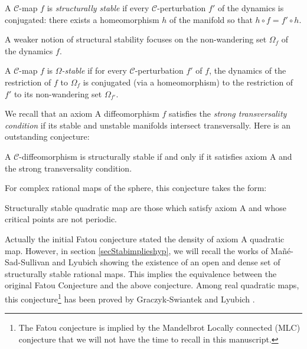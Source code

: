 \documentclass[11pt,openany,leqno]{article}
\begin{document}
 \begin{defi} A $\mathcal C$-map $f$ is \emph{structurally stable}  if every $\mathcal C$-perturbation $f'$ of the dynamics is conjugated: there exists a homeomorphism $h$ of the manifold so that $h\circ f= f'\circ h$. 
\end{defi}
A weaker notion of structural stability focuses on the non-wandering set $\Omega_f$ of the dynamics $f$.
\begin{defi} A $\mathcal C$-map $f$ is \emph{$\Omega$-stable}  if for every $\mathcal C$-perturbation $f'$ of $f$, the dynamics of the restriction of $f$ to $\Omega_f$ is conjugated (via a homeomorphism) to the restriction of $f'$ to its non-wandering set $\Omega_{f'}$.
\end{defi}

We recall that an axiom A diffeomorphism $f$ satisfies the \emph{strong transversality condition} if its stable and unstable manifolds intersect transversally. Here is an outstanding conjecture:
\begin{conj}
A $\mathcal C$-diffeomorphism is structurally stable if and only if it satisfies  axiom A and the strong transversality condition. 
\end{conj}
%

For complex rational maps of the sphere, this conjecture takes the form:
\begin{conj}
Structurally stable quadratic map are those which  satisfy  axiom A and whose critical points are not periodic.
\end{conj}
Actually the initial Fatou conjecture stated the density of axiom A quadratic map. However, in section \ref{secStabimplieshyp},  we will recall the works of Ma\~ n\'e-Sad-Sullivan \cite{MSS} and Lyubich \cite{Ly84} showing the existence of an open and dense set of structurally stable rational maps. This implies the equivalence between the original Fatou Conjecture and the above conjecture.
 Among real quadratic maps, this conjecture\footnote{
The Fatou conjecture is implied by the Mandelbrot Locally connected (MLC) conjecture that we will not have the time to recall in this manuscript.}
 has been proved by Graczyk-Swiantek \cite{GS97} and Lyubich \cite{Ly97}. 
 
\end{document}

